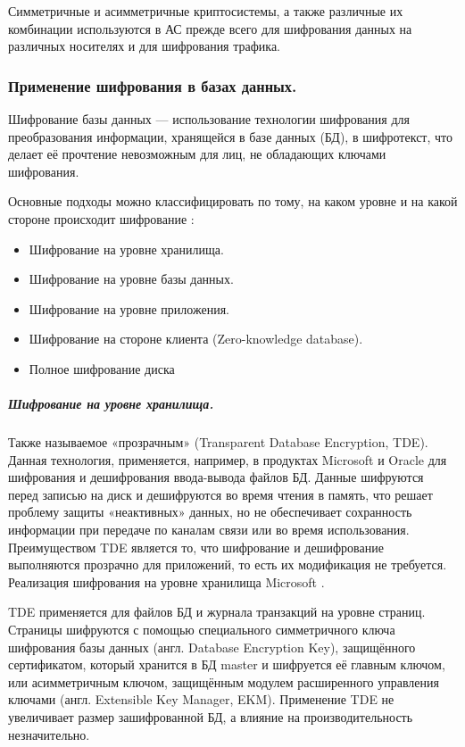 Симметричные и асимметричные криптосистемы, а также различные их комбинации используются в АС
прежде всего для шифрования данных на различных носителях и для шифрования трафика.


\subsubsection{Применение шифрования в базах данных.}

Шифрование базы данных — использование технологии шифрования для преобразования информации,
хранящейся в базе данных (БД), в шифротекст, что делает её прочтение невозможным для лиц, не
обладающих ключами шифрования.

Основные подходы можно классифицировать по тому, на каком уровне и на какой стороне происходит шифрование \cite{DB-ENC}:
\begin{itemize}
    \item Шифрование на уровне хранилища.
    \item Шифрование на уровне базы данных.
    \item Шифрование на уровне приложения.
    \item Шифрование на стороне клиента (Zero-knowledge database).
    \item Полное шифрование диска
\end{itemize}

\subparagraph{Шифрование на уровне хранилища.}
Также называемое «прозрачным» (Transparent Database Encryption, TDE). Данная технология,
применяется, например, в продуктах Microsoft и Oracle для шифрования и дешифрования ввода-вывода
файлов БД. Данные шифруются перед записью на диск и дешифруются во время чтения в память, что
решает проблему защиты «неактивных» данных, но не обеспечивает сохранность информации при передаче
по каналам связи или во время использования. Преимуществом TDE является то, что шифрование и
дешифрование выполняются прозрачно для приложений, то есть их модификация не требуется. \\

Реализация шифрования на уровне хранилища Microsoft \cite{Microsoft-TDE}.

TDE применяется для файлов БД и журнала транзакций на уровне страниц. Страницы шифруются с помощью
специального симметричного ключа шифрования базы данных (англ. Database Encryption Key),
защищённого сертификатом, который хранится в БД master и шифруется её главным ключом, или
асимметричным ключом, защищённым модулем расширенного управления ключами (англ. Extensible Key
Manager, EKM). Применение TDE не увеличивает размер зашифрованной БД, а влияние на
производительность незначительно. \\

